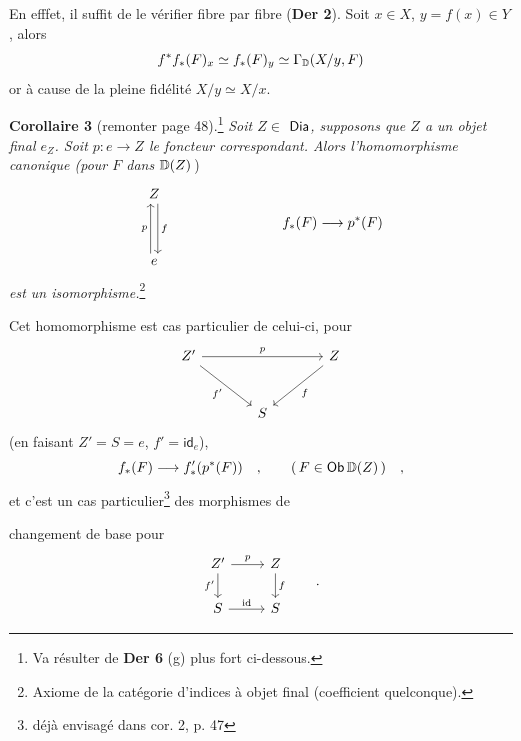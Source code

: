 En efffet, il suffit de le vérifier fibre par fibre (\textbf{Der 2}). Soit $x \in X$, $y = f(x) \in Y$, %
alors
\[ f^{*} f_{*}(F)_{x} \simeq f_{*}(F)_{y} \simeq \Gamma_{\mathbb{D}}(X/y, F) \]
or à cause de la pleine fidélité $X/y \simeq X/x$.

\noindent\textbf{Corollaire 3} (remonter page 48).\footnote[20]{Va résulter de \textbf{Der 6} (g) plus fort ci-dessous.} \textit{Soit $Z \in$} $\mathsf{Dia}$\textit{, supposons que $Z$ a un objet final $e_{Z}$. Soit $p : e \to Z$ le foncteur correspondant. Alors l'homomorphisme canonique (pour $F$ dans} $\mathbb{D}(Z)$\,)
\[
\begin{tikzcd}[row sep=huge]
Z \arrow[d, shift left=0.6ex, "f"] \\
e \arrow[u, shift left=0.6ex, "p"]
\end{tikzcd}
\qquad\qquad\qquad\qquad
f_{*}(F) \longrightarrow p^{*}(F)
\]
\textit{est un isomorphisme.}\footnote[21]{Axiome de la catégorie d'indices à objet final (coefficient quelconque).}

Cet homomorphisme est cas particulier de celui-ci, pour
\[
\begin{tikzcd}[row sep=large, column sep=large]
Z' \arrow[rr, "p"] \arrow[dr, "f'"'] & & Z \arrow[dl, "f"] \\
& S &
\end{tikzcd}
\]
(en faisant $Z' = S = e$, $f' = \mathsf{id}_{e}$),
\[ f_{*}(F) \longrightarrow f'_{*}(p^{*}(F)) \quad , \qquad (\, F \in \mathsf{Ob}\,\mathbb{D}(Z)\,) \quad , \]
et c'est un cas particulier\footnote[22]{déjà envisagé dans cor. 2, p. 47} des morphismes de



\noindent{}
changement de base pour
\[
\begin{tikzcd}
Z' \arrow[r, "p"] \arrow[d, "f'"'] & Z \arrow[d, "f"] \\
S \arrow[r, "\id"] & S
\end{tikzcd}
\qquad .
\]

